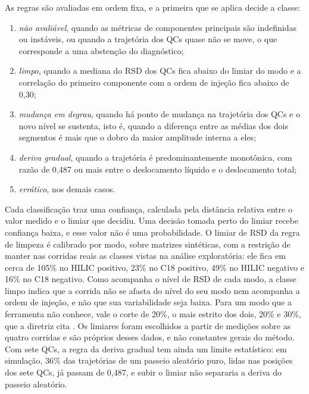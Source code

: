 As regras são avaliadas em ordem fixa, e a primeira que se aplica decide a classe:

\begin{enumerate}
\item
  \emph{não avaliável}, quando as métricas de componentes principais são indefinidas ou instáveis, ou quando a trajetória dos QCs quase não se move, o que corresponde a uma abstenção do diagnóstico;
\item
  \emph{limpo}, quando a mediana do RSD dos QCs fica abaixo do limiar do modo e a correlação do primeiro componente com a ordem de injeção fica abaixo de 0,30;
\item
  \emph{mudança em degrau}, quando há ponto de mudança na trajetória dos QCs e o novo nível se sustenta, isto é, quando a diferença entre as médias dos dois segmentos é mais que o dobro da maior amplitude interna a eles;
\item
  \emph{deriva gradual}, quando a trajetória é predominantemente monotônica, com razão de 0,487 ou mais entre o deslocamento líquido e o deslocamento total;
\item
  \emph{errático}, nos demais casos.
\end{enumerate}

Cada classificação traz uma confiança, calculada pela distância relativa entre o valor medido e o limiar que decidiu. Uma decisão tomada perto do limiar recebe confiança baixa, e esse valor não é uma probabilidade. O limiar de RSD da regra de limpeza é calibrado por modo, sobre matrizes sintéticas, com a restrição de manter nas corridas reais as classes vistas na análise exploratória: ele fica em cerca de 105\% no HILIC positivo, 23\% no C18 positivo, 49\% no HILIC negativo e 16\% no C18 negativo. Como acompanha o nível de RSD de cada modo, a classe limpo indica que a corrida não se afasta do nível do seu modo nem acompanha a ordem de injeção, e não que sua variabilidade seja baixa. Para um modo que a ferramenta não conhece, vale o corte de 20\%, o mais estrito dos dois, 20\% e 30\%, que a diretriz cita \cite{broadhurst2018guidelines}. Os limiares foram escolhidos a partir de medições sobre as quatro corridas e são próprios desses dados, e não constantes gerais do método. Com sete QCs, a regra da deriva gradual tem ainda um limite estatístico: em simulação, 36\% das trajetórias de um passeio aleatório puro, lidas nas posições dos sete QCs, já passam de 0,487, e subir o limiar não separaria a deriva do passeio aleatório.

